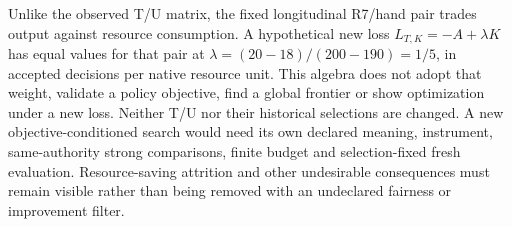 Unlike the observed T/U matrix, the fixed longitudinal R7/hand pair trades
output against resource consumption. A hypothetical new loss
$L_{T,K}=-A+\lambda K$ has equal values for that pair at
$\lambda=(20-18)/(200-190)=1/5$, in accepted decisions per native resource unit.
This algebra does not adopt that weight, validate a policy objective, find a
global frontier or show optimization under a new loss. Neither T/U nor their
historical selections are changed. A new objective-conditioned search would
need its own declared meaning, instrument, same-authority strong comparisons,
finite budget and selection-fixed fresh evaluation. Resource-saving attrition
and other undesirable consequences must remain visible rather than being
removed with an undeclared fairness or improvement filter.
